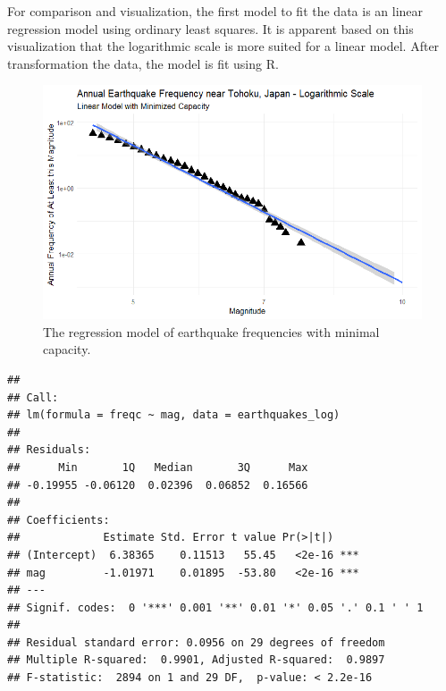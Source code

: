 For comparison and visualization, the first model to fit the data is an linear regression model using ordinary least squares.  It is apparent based on this visualization that the logarithmic scale is more suited for a linear model.  After transformation the data, the model is fit using R.

\begin{figure}[H]
    \center
    \includegraphics[width=0.65\linewidth]{Figures/tohoku_logscale_fit.png}
    \caption{\footnotesize{The regression model of earthquake frequencies with minimal capacity.}}
    \label{tohoku_lm}
\end{figure}

\begin{verbatim}
## 
## Call:
## lm(formula = freqc ~ mag, data = earthquakes_log)
## 
## Residuals:
##      Min       1Q   Median       3Q      Max 
## -0.19955 -0.06120  0.02396  0.06852  0.16566 
## 
## Coefficients:
##             Estimate Std. Error t value Pr(>|t|)    
## (Intercept)  6.38365    0.11513   55.45   <2e-16 ***
## mag         -1.01971    0.01895  -53.80   <2e-16 ***
## ---
## Signif. codes:  0 '***' 0.001 '**' 0.01 '*' 0.05 '.' 0.1 ' ' 1
## 
## Residual standard error: 0.0956 on 29 degrees of freedom
## Multiple R-squared:  0.9901, Adjusted R-squared:  0.9897 
## F-statistic:  2894 on 1 and 29 DF,  p-value: < 2.2e-16
\end{verbatim}


